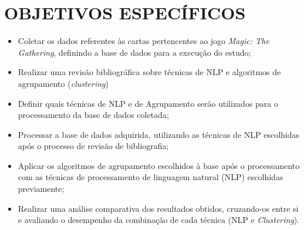 \section{OBJETIVOS ESPECÍFICOS}
\label{sec:objetivos_especificos}

\begin{itemize}

    \item Coletar os dados referentes às cartas pertencentes ao jogo \textit{Magic: The Gathering}, definindo a base de dados para a execução do estudo;
    \item Realizar uma revisão bibliográfica sobre técnicas de NLP e algoritmos de agrupamento (\textit{clustering})
    \item Definir quais técnicas de NLP e de Agrupamento serão utilizados para o processamento da base de dados coletada;
    \item Processar a base de dados adquirida, utilizando as técnicas de NLP escolhidas após o processo de revisão de bibliografia;
    \item Aplicar os algoritmos de agrupamento escolhidos à base após o processamento com as técnicas de processamento de linguagem natural (NLP) escolhidas previamente;
    \item Realizar uma análise comparativa dos resultados obtidos, cruzando-os entre si e avaliando o desempenho da combinação de cada técnica (NLP e \textit{Clustering}).
\end{itemize}
